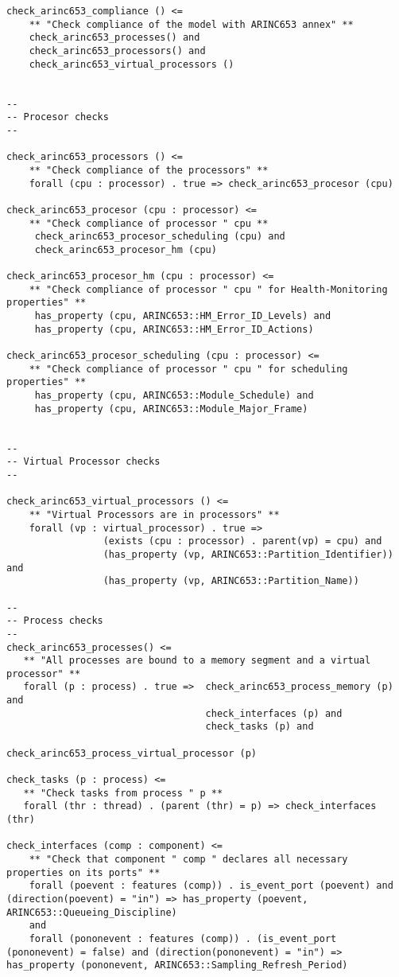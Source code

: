 \documentclass[times, 10pt]{article}
\begin{document}
\begin{lstlisting}
check_arinc653_compliance () <=
	** "Check compliance of the model with ARINC653 annex" **
	check_arinc653_processes() and
	check_arinc653_processors() and
	check_arinc653_virtual_processors ()


--
-- Procesor checks
--
    
check_arinc653_processors () <=
	** "Check compliance of the processors" **
	forall (cpu : processor) . true => check_arinc653_procesor (cpu)

check_arinc653_procesor (cpu : processor) <=
	** "Check compliance of processor " cpu **
	 check_arinc653_procesor_scheduling (cpu) and
	 check_arinc653_procesor_hm (cpu)
		 
check_arinc653_procesor_hm (cpu : processor) <=
	** "Check compliance of processor " cpu " for Health-Monitoring properties" **
	 has_property (cpu, ARINC653::HM_Error_ID_Levels) and
	 has_property (cpu, ARINC653::HM_Error_ID_Actions)

check_arinc653_procesor_scheduling (cpu : processor) <=
	** "Check compliance of processor " cpu " for scheduling properties" **
	 has_property (cpu, ARINC653::Module_Schedule) and
	 has_property (cpu, ARINC653::Module_Major_Frame)
	
	
-- 
-- Virtual Processor checks
--
	
check_arinc653_virtual_processors () <=
	** "Virtual Processors are in processors" **
	forall (vp : virtual_processor) . true => 
	             (exists (cpu : processor) . parent(vp) = cpu) and
	             (has_property (vp, ARINC653::Partition_Identifier)) and
	             (has_property (vp, ARINC653::Partition_Name))

--
-- Process checks
--
check_arinc653_processes() <=
   ** "All processes are bound to a memory segment and a virtual processor" **
   forall (p : process) . true =>  check_arinc653_process_memory (p) and 
                                   check_interfaces (p) and
                                   check_tasks (p) and 
                                   check_arinc653_process_virtual_processor (p)

check_tasks (p : process) <=
   ** "Check tasks from process " p **
   forall (thr : thread) . (parent (thr) = p) => check_interfaces (thr) 

check_interfaces (comp : component) <=
	** "Check that component " comp " declares all necessary properties on its ports" **
	forall (poevent : features (comp)) . is_event_port (poevent) and (direction(poevent) = "in") => has_property (poevent, ARINC653::Queueing_Discipline)
	and
	forall (pononevent : features (comp)) . (is_event_port (pononevent) = false) and (direction(pononevent) = "in") => has_property (pononevent, ARINC653::Sampling_Refresh_Period)



\end{lstlisting}
\end{document}
